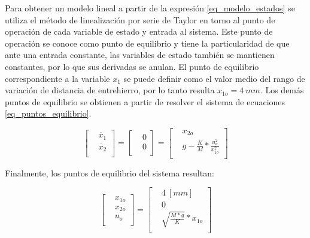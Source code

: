 Para obtener un modelo lineal a partir de la expresión \ref{eq_modelo_estados} se utiliza el método de linealización por serie de Taylor en torno al punto de operación de cada variable de estado y entrada al sistema. Este punto de operación se conoce como punto de equilibrio y tiene la particularidad de que ante una entrada constante, las variables de estado también se mantienen constantes, por lo que sus derivadas se anulan. El punto de equilibrio correspondiente a la variable $x_1$ se puede definir como el valor medio del rango de variación de distancia de entrehierro, por lo tanto resulta $x_{1o}=4\:mm$. Los demás puntos de equilibrio se obtienen a partir de resolver el sistema de ecuaciones \ref{eq_puntos_equilibrio}.

\begin{equation} \label{eq_puntos_equilibrio}
	\begin{bmatrix} %
		&\dot{x_{1}}\\
		&\dot{x_{2}}\\
	\end{bmatrix}
	=
	\begin{bmatrix} %
		&0\\
		&0\\
	\end{bmatrix}
	=
	\begin{bmatrix} %
		&x_{2o}\\
		&g-\frac{K}{M}*\frac{u_o^{2}}{x_{1o}^{2}}\\
	\end{bmatrix}
\end{equation}

Finalmente, los puntos de equilibrio del sistema resultan:

\begin{equation}\label{eq_puntos_equil}
	\begin{bmatrix}
		&x_{1o}\\
		&x_{2o}\\
		&u_{o}\\
	\end{bmatrix}
	=
	\begin{bmatrix}
		&4\:[mm]\\
		&0\\
		&\sqrt{\frac{M*g}{K}}*x_{1o}\\
	\end{bmatrix}
\end{equation}



